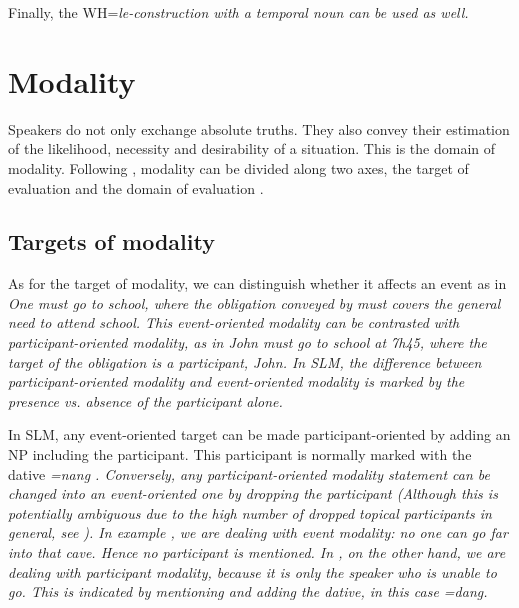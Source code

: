 Finally, the WH=\em le\em-construction with a temporal noun can be used as well.



\section{Modality}\label{sec:func:Modality}
Speakers do not only exchange absolute truths. They also convey their estimation of the likelihood, necessity and desirability of a situation. This is the domain of modality. Following \citet{Hengeveld2004imm}, modality can be divided along two axes, the target of evaluation   and the domain of evaluation .

\subsection{Targets of modality}\label{sec:func:Modality:targets}
As for the target of modality, we can distinguish whether it affects an event as in \em One must go to school\em, where the obligation conveyed by \em must \em covers the general need to attend school. This event-oriented modality can be contrasted with participant-oriented modality, as in \em John must go to school at 7h45\em, where the target of the obligation is  a participant, John. In SLM, the difference between participant-oriented modality and event-oriented modality is marked by the presence vs. absence of the participant alone.

In SLM, any event-oriented target can be made participant-oriented by adding an NP including the participant. This participant is normally marked with the dative \em =nang \em {}. Conversely, any participant-oriented modality statement can be changed into an event-oriented one by dropping the participant (Although this is potentially ambiguous due to the high number of dropped topical participants in general, see ).
In example , we are dealing with event modality: no one can go far into that cave. Hence no participant is mentioned. In , on the other hand, we are dealing with participant modality, because it is only the speaker who is unable to go. This is indicated by mentioning  and adding the dative, in this case \em =dang\em.


